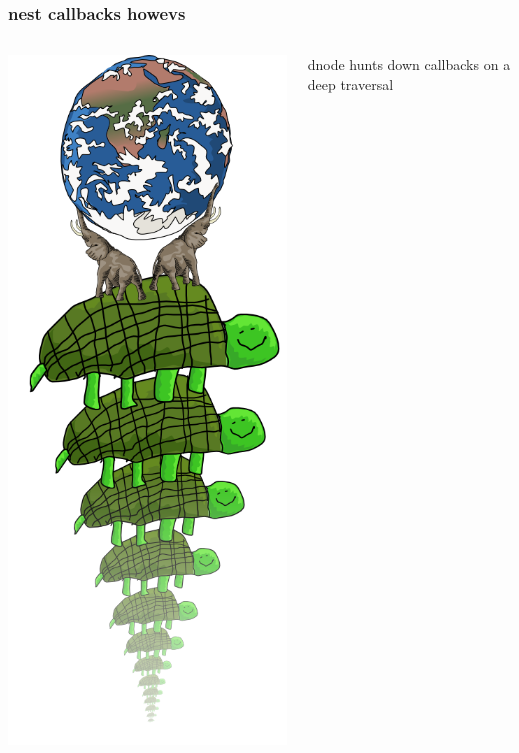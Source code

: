 \documentclass{beamer}
\begin{document}
\begin{frame}
    \frametitle{nest callbacks howevs}
    \begin{columns}[c]
        \includegraphics[scale=0.28]{images/all_the_way_down.png}
        \begin{center}
        \fbox{}
        \newline
        
        \pause
        \huge
        dnode hunts down callbacks on a deep traversal
        
        \end{center}
    \end{columns}
\end{frame}
\end{document}
